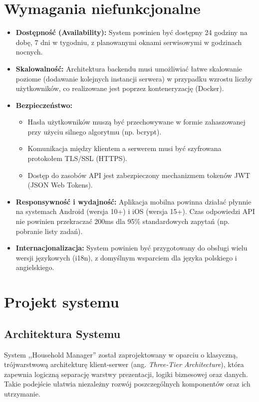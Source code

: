 \section{Wymagania niefunkcjonalne}

\begin{itemize}
    \item \textbf{Dostępność (Availability):} System powinien być dostępny 24 godziny na dobę, 7 dni w tygodniu, z planowanymi oknami serwisowymi w godzinach nocnych.
    \item \textbf{Skalowalność:} Architektura backendu musi umożliwiać łatwe skalowanie poziome (dodawanie kolejnych instancji serwera) w przypadku wzrostu liczby użytkowników, co realizowane jest poprzez konteneryzację (Docker).
    \item \textbf{Bezpieczeństwo:}
        \begin{itemize}
            \item Hasła użytkowników muszą być przechowywane w formie zahaszowanej przy użyciu silnego algorytmu (np. bcrypt).
            \item Komunikacja między klientem a serwerem musi być szyfrowana protokołem TLS/SSL (HTTPS).
            \item Dostęp do zasobów API jest zabezpieczony mechanizmem tokenów JWT (JSON Web Tokens).
        \end{itemize}
    \item \textbf{Responsywność i wydajność:} Aplikacja mobilna powinna działać płynnie na systemach Android (wersja 10+) i iOS (wersja 15+). Czas odpowiedzi API nie powinien przekraczać 200ms dla 95\% standardowych zapytań (np. pobranie listy zadań).
    \item \textbf{Internacjonalizacja:} System powinien być przygotowany do obsługi wielu wersji językowych (i18n), z domyślnym wsparciem dla języka polskiego i angielskiego.
\end{itemize}

\section{Projekt systemu}

\subsection{Architektura Systemu}

System ,,Household Manager'' został zaprojektowany w oparciu o klasyczną, trójwarstwową architekturę klient-serwer (ang. \textit{Three-Tier Architecture}), która zapewnia logiczną separację warstwy prezentacji, logiki biznesowej oraz danych. Takie podejście ułatwia niezależny rozwój poszczególnych komponentów oraz ich utrzymanie.

